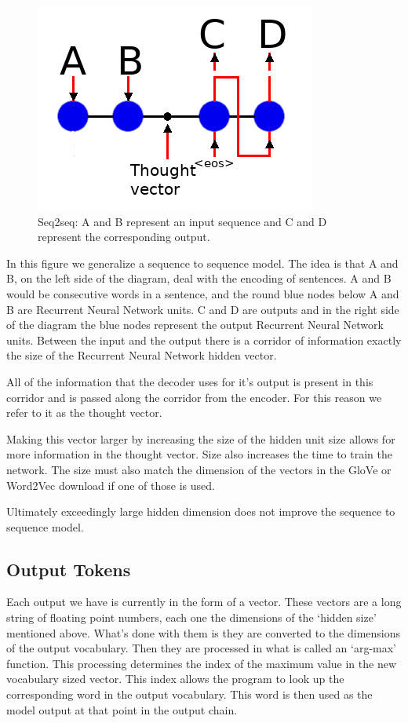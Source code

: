 \begin{figure}[H]
	\begin{center}
	
	\includegraphics[scale=0.5]{diagram-nmt}
		
\end{center}
	\caption[Sequence to Sequence Architecture]{Seq2seq: A and B represent an input sequence and C and D represent the corresponding output.}
	

\end{figure}

In this figure we generalize a sequence to sequence model. The idea is that A and B, on the left side of the diagram, deal with the encoding of sentences. A and B would be consecutive words in a sentence, and the round blue nodes below A and B are Recurrent Neural Network units. C and D are outputs and in the right side of the diagram the blue nodes represent the output Recurrent Neural Network units. Between the input and the output there is a corridor of information exactly the size of the Recurrent Neural Network hidden vector. 

All of the information that the decoder uses for it\textquoteright s output is present in this corridor and is passed along the corridor from the encoder. For this reason we refer to it as the thought vector.

Making this vector larger by increasing the size of the hidden unit size allows for more information in the thought vector. Size also increases the time to train the network. The size must also match the dimension of the vectors in the GloVe or Word2Vec download if
one of those is used. 

Ultimately exceedingly large hidden dimension does not improve the sequence to sequence model.

\subsection*{Output Tokens}
Each output we have is currently in the form of a vector. These vectors are a long string of floating point numbers, each one the dimensions of the `hidden size' mentioned above. What's done with them is they are converted to the dimensions of the output vocabulary. Then they are processed in what is called an `arg-max' function. This processing determines the index of the maximum value in the new vocabulary sized vector. This index allows the program to look up the corresponding word in the output vocabulary. This word is then used as the model output at that point in the output chain.

